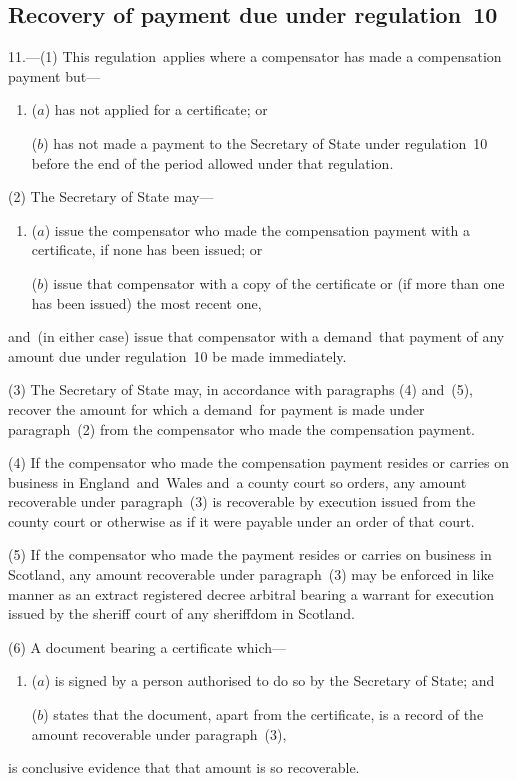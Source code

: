 \documentclass[12pt,a4paper]{article}
\begin{document}
\subsection[11. Recovery of payment due under regulation~10]{Recovery of payment due under regulation~10}

11.---(1)  This regulation~applies where a compensator has made a compensation payment but—
\begin{enumerate}\item[]
($a$) has not applied for a certificate; or

($b$) has not made a payment to the Secretary of State under regulation~10 before the end of the period allowed under that regulation.
\end{enumerate}

(2) The Secretary of State may—
\begin{enumerate}\item[]
($a$) issue the compensator who made the compensation payment with a certificate, if none has been issued; or

($b$) issue that compensator with a copy of the certificate or (if more than one has been issued) the most recent one,
\end{enumerate}
and~(in either case) issue that compensator with a demand~that payment of any amount due under regulation~10 be made immediately.

(3) The Secretary of State may, in accordance with paragraphs (4) and~(5), recover the amount for which a demand~for payment is made under paragraph~(2) from the compensator who made the compensation payment.

(4) If the compensator who made the compensation payment resides or carries on business in England~and~Wales and~a county court so orders, any amount recoverable under paragraph~(3) is recoverable by execution issued from the county court or otherwise as if it were payable under an order of that court.

(5) If the compensator who made the payment resides or carries on business in Scotland, any amount recoverable under paragraph~(3) may be enforced in like manner as an extract registered decree arbitral bearing a warrant for execution issued by the sheriff court of any sheriffdom in Scotland.

(6) A document bearing a certificate which—
\begin{enumerate}\item[]
($a$) is signed by a person authorised to do so by the Secretary of State; and

($b$) states that the document, apart from the certificate, is a record of the amount recoverable under paragraph~(3),
\end{enumerate}
is conclusive evidence that that amount is so recoverable.
\end{document}
